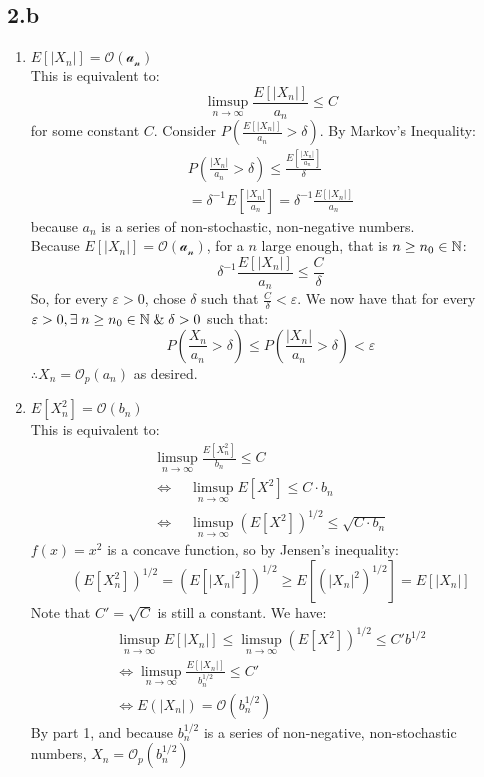 \subsection{2.b}
\begin{enumerate}
    \item \(E[|X_n|]=\mathcal{O(a_n)}\) \\
    This is equivalent to: 
    \[
    \limsup_{n\rightarrow\infty} \frac{E[|X_n|]}{a_n} \leq C
    \]
    for some constant \(C\).  Consider \(P(\frac{E[|X_n|]}{a_n}> \delta)\).  By Markov's Inequality:
    \begin{align*}
        P(\frac{|X_n|}{a_n}> \delta) \leq \frac{E\left [\frac{|X_n|}{a_n}\right ]}{\delta} \\
        =\delta^{-1}E\left [\frac{|X_n|}{a_n}\right ] = \delta^{-1}\frac{E[|X_n|]}{a_n}
    \end{align*}
    because \(a_n\) is a series of non-stochastic, non-negative numbers. \\
    Because \(E[|X_n|]=\mathcal{O(a_n)}\), for a $n$ large enough, that is \(n\geq n_0 \in {\Bbb N}\):
    \[
    \delta^{-1}\frac{E[|X_n|]}{a_n} \leq \frac{C}{\delta}
    \]
    So, for every \(\varepsilon>0\), chose $\delta$ such that \(\frac{C}{\delta}<\varepsilon\).  We now have that for every \(\varepsilon>0, \exists \;n\geq n_0 \in {\Bbb N}\;\&\; \delta>0 \) such that:
    \[
    P \left (\frac{X_n}{a_n} > \delta \right) \leq P \left (\frac{|X_n|}{a_n}> \delta\right ) <\varepsilon
    \]
    \(\therefore X_n =\mathcal{O}_p(a_n)\) as desired.
    \item \(E[X_n^2]=\mathcal{O}(b_n)\) \\
    This is equivalent to: 
    \begin{align*}
        \limsup_{n\rightarrow\infty} \frac{E[X_n^2]}{b_n} \leq C  \nonumber\\
        \Leftrightarrow \quad \limsup_{n\rightarrow\infty} E[X^2] \leq C \cdot b_n \nonumber \\
        \Leftrightarrow \quad \limsup_{n\rightarrow\infty} (E[X^2])^{1/2} \leq \sqrt{C \cdot b_n} 
    \end{align*}
    \(f(x) = x^2\) is a concave function, so by Jensen's inequality:
    \[
    (E[X_n^2])^{1/2} = (E[|X_n|^2])^{1/2} \geq E[(|X_n|^2)^{1/2}] = E[|X_n|]
    \]
    Note that \(C' = \sqrt{C}\) is still a constant.  We have:
    \begin{align*}
         \limsup_{n\rightarrow\infty}E[|X_n|] \leq \limsup_{n\rightarrow\infty} (E[X^2])^{1/2} \leq C'b^{1/2} \\
         \Leftrightarrow \limsup_{n\rightarrow\infty} \frac{E[|X_n|]}{b_n^{1/2}} \leq C' \\
         \Leftrightarrow E(|X_n|) = \mathcal{O}(b_n^{1/2})
    \end{align*}
    By part 1, and because \(b_n^{1/2}\) is a series of non-negative, non-stochastic numbers, \(X_n=\mathcal{O}_p(b_n^{1/2})\)
\end{enumerate}